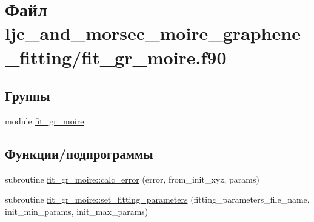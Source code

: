 \hypertarget{fit__gr__moire_8f90}{}\section{Файл ljc\+\_\+and\+\_\+morsec\+\_\+moire\+\_\+graphene\+\_\+fitting/fit\+\_\+gr\+\_\+moire.f90}
\label{fit__gr__moire_8f90}
\subsection*{Группы}
\begin{DoxyCompactItemize}
\item 
module \mbox{\hyperlink{namespacefit__gr__moire}{fit\+\_\+gr\+\_\+moire}}
\end{DoxyCompactItemize}
\subsection*{Функции/подпрограммы}
\begin{DoxyCompactItemize}
\item 
subroutine \mbox{\hyperlink{namespacefit__gr__moire_aafdddfaa3c2b90a3ab2c09735bc5068b}{fit\+\_\+gr\+\_\+moire\+::calc\+\_\+error}} (error, from\+\_\+init\+\_\+xyz, params)
\item 
subroutine \mbox{\hyperlink{namespacefit__gr__moire_a68bd3fd9fb813f29fb1ba6ad58c05a9d}{fit\+\_\+gr\+\_\+moire\+::set\+\_\+fitting\+\_\+parameters}} (fitting\+\_\+parameters\+\_\+file\+\_\+name, init\+\_\+min\+\_\+params, init\+\_\+max\+\_\+params)
\end{DoxyCompactItemize}
